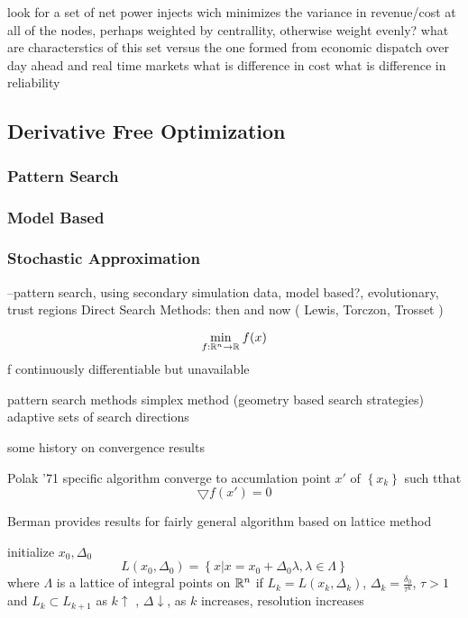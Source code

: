 look for a set of net power injects wich minimizes the variance in revenue/cost at all of the nodes, perhaps weighted by centrallity, otherwise weight evenly?
what are characterstics of this set versus the one formed from economic dispatch over day ahead and real time markets
what is difference in cost
what is difference in reliability




\subsection{Derivative Free Optimization}

\subsubsection{Pattern Search}

\subsubsection{Model Based}

\subsubsection{Stochastic Approximation}


--pattern search, using secondary simulation data, model based?, evolutionary, trust regions
Direct Search Methods: then and now ( Lewis, Torczon, Trosset ) \cite{lewis_2000}

\begin{equation}
\min_{ f: \mathbb{R}^{n} \rightarrow \mathbb{R}^{}} f(x)
\end{equation}
f continuously differentiable but unavailable

pattern search methods
simplex method (geometry based search strategies)
adaptive sets of search directions

some history on convergence results

Polak '71 specific algorithm converge to accumlation point $x'$ of $\left\{x_k\right\}$ such tthat 
\begin{equation}
\bigtriangledown f(x') = 0
\end{equation}

Berman provides results for fairly general algorithm based on lattice method

initialize 
$x_0, \Delta_0$
\begin{equation}
L(x_0, \Delta_0) = \left\{ x | x = x_0 + \Delta_0 \lambda, \lambda \in \Lambda \right\}
\end{equation}
where $\Lambda $ is a lattice of integral points on $\mathbb{R}^{n}$
if $L_k  = L(x_k, \Delta_k)$, $\Delta_k = \frac{\delta_0}{\tau^k}$, $\tau > 1$ and $L_k \subset L_{k+1}$
as $k \uparrow$ , $\Delta \downarrow$, as $k$ increases, resolution increases

